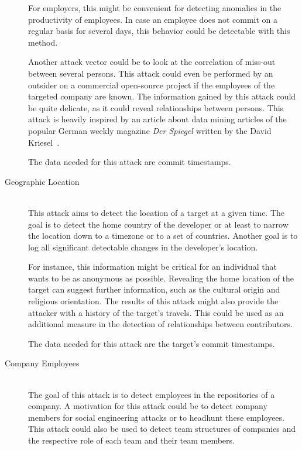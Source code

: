 \begin{description}
        For employers, this might be convenient for detecting anomalies in the productivity of employees.
        In case an employee does not commit on a regular basis for several days, this behavior could be detectable with this method.

        Another attack vector could be to look at the correlation of miss-out between several persons.
        This attack could even be performed by an outsider on a commercial open-source project if the employees of the targeted company are known.
        The information gained by this attack could be quite delicate, as it could reveal relationships between persons.
        This attack is heavily inspired by an article about data mining articles of the popular German weekly magazine \emph{Der Spiegel} written by the David Kriesel~\cite{article:spiegel-mining}.

        The data needed for this attack are commit timestamps.

    \item[Geographic Location]~\label{attack:geographic-location} \hfill \\
        This attack aims to detect the location of a target at a given time.
        The goal is to detect the home country of the developer or at least to narrow the location down to a timezone or to a set of countries.
        Another goal is to log all significant detectable changes in the developer's location.

        For instance, this information might be critical for an individual that wants to be as anonymous as possible.
        Revealing the home location of the target can suggest further information, such as the cultural origin and religious orientation.
        The results of this attack might also provide the attacker with a history of the target's travels.
        This could be used as an additional measure in the detection of relationships between contributors.

        The data needed for this attack are the target's commit timestamps.

    \item[Company Employees]~\label{attack:company-employees} \hfill \\
        The goal of this attack is to detect employees in the repositories of a company.
        A motivation for this attack could be to detect company members for social engineering attacks or to headhunt these employees.
        This attack could also be used to detect team structures of companies and the respective role of each team and their team members.


\end{description}
